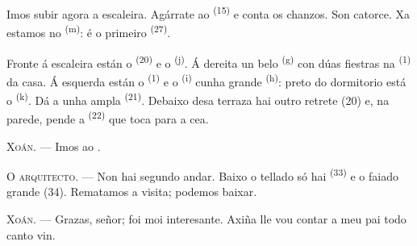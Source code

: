 Imos subir agora a escaleira. Agárrate ao  \textsuperscript{(15)} e conta os
chanzos. Son catorce. Xa estamos no  \textsuperscript{(m)}: é o primeiro
 \textsuperscript{(27)}.

\VUsaut{3.0mm}
\VUsaut{3.0mm}

Fronte á escaleira están o  \textsuperscript{(20)} e o 
\textsuperscript{(j)}. Á dereita un belo  \textsuperscript{(g)} con dúas
fiestras na  \textsuperscript{(1)} da casa. Á esquerda están o
 \textsuperscript{(1)} e o
 \textsuperscript{(i)} cunha grande 
\textsuperscript{(h)}: preto do dormitorio está o 
\textsuperscript{(k)}. Dá a unha ampla  \textsuperscript{(21)}. Debaixo desa
terraza hai outro retrete (20) e, na parede, pende a  \textsuperscript{(22)} que
toca para a cea.

\textsc{Xoán}. --- Imos ao .

\textsc{O arquitecto}. --- Non hai segundo andar. Baixo o tellado só hai
 \textsuperscript{(33)} e o faiado grande (34). Rematamos a visita;
podemos baixar.

\textsc{Xoán}. --- Grazas, señor; foi moi interesante. Axiña lle vou contar a meu pai todo
canto vin.
